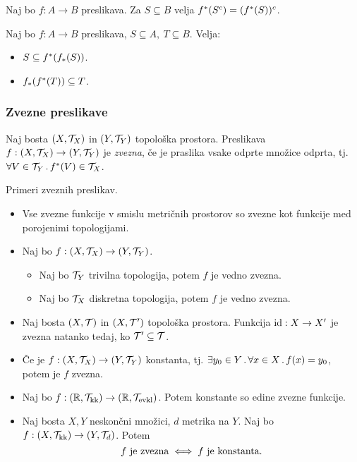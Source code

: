 \begin{trditev}
    Naj bo $f: A \to B$ preslikava. Za $S \subseteq B$ velja $f^{*}(S^c) = (f^{*}(S))^c$.
\end{trditev}

\begin{trditev}
    Naj bo $f: A \to B$ preslikava, $S \subseteq A, \ T \subseteq B$. Velja:
    \begin{itemize}
        \item $S \subseteq f^{*}(f_{*}(S))$.
        \item $f_{*}(f^{*}(T)) \subseteq T$.
    \end{itemize}
\end{trditev}

\subsubsection{Zvezne preslikave}
\begin{definicija}    
    Naj bosta $(X, \mathcal{T}_X)$ in $(Y, \mathcal{T}_Y)$ topološka prostora. Preslikava $f: (X, \mathcal{T}_X) \to (Y, \mathcal{T}_Y)$ je \emph{zvezna}, če je praslika vsake odprte množice odprta, tj. $\forall V \in \mathcal{T}_Y \,.\, f^{*}(V) \in \mathcal{T}_X$.
\end{definicija}

\begin{primer}
    Primeri zveznih preslikav.
    \begin{itemize}
        \item Vse zvezne funkcije v smislu metričnih prostorov so zvezne kot funkcije med porojenimi topologijami.
        \item Naj bo $f: (X, \mathcal{T}_X) \to (Y, \mathcal{T}_Y)$. 
        \begin{itemize}
            \item Naj bo $\mathcal{T}_Y$ trivilna topologija, potem $f$ je vedno zvezna.
            \item Naj bo $\mathcal{T}_X$ diskretna topologija, potem $f$ je vedno zvezna.
        \end{itemize}
        \item Naj bosta $(X, \mathcal{T})$ in $(X, \mathcal{T}')$ topološka prostora. Funkcija $\operatorname{id}: X \to X'$ je zvezna natanko tedaj, ko $\mathcal{T}' \subseteq \mathcal{T}$.
        \item Če je $f: (X, \mathcal{T}_X) \to (Y, \mathcal{T}_Y)$ konstanta, tj. $\exists y_0 \in Y \,.\, \forall x \in X \,.\, f(x) = y_0$, potem je $f$ zvezna.
        \item Naj bo $f: (\mathbb{R}, \mathcal{T}_{\text{kk}}) \to (\mathbb{R}, \mathcal{T}_{\text{evkl}})$. Potem konstante so edine zvezne funkcije.         
        \item Naj bosta $X, Y$ neskončni množici, $d$ metrika na $Y$. Naj bo $f: (X, \mathcal{T}_{\text{kk}}) \to (Y, \mathcal{T}_d)$. Potem 
        $$f \text{ je zvezna} \iff f \text{ je konstanta}.$$
    \end{itemize}
\end{primer}

